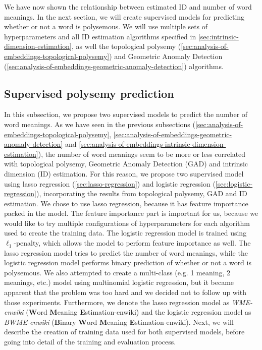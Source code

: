 We have now shown the relationship between estimated ID and number of word meanings. In the next section, we will create supervised models for predicting whether or not a word is polysemous. We will use multiple sets of hyperparameters and all ID estimation algorithms specified in \cref{sec:intrinsic-dimension-estimation}, as well the topological polysemy (\cref{sec:analysis-of-embeddings-topological-polysemy}) and Geometric Anomaly Detection (\cref{sec:analysis-of-embeddings-geometric-anomaly-detection}) algorithms.

\subsection{Supervised polysemy prediction}
\label{sec:analysis-of-embeddings-supervised-polysemy-prediction}
In this subsection, we propose two supervised models to predict the number of word meanings. As we have seen in the previous subsections (\cref{sec:analysis-of-embeddings-topological-polysemy}, \cref{sec:analysis-of-embeddings-geometric-anomaly-detection} and \cref{sec:analysis-of-embeddings-intrinsic-dimension-estimation}), the number of word meanings seem to be more or less correlated with topological polysemy, Geometric Anomaly Detection (GAD) and intrinsic dimension (ID) estimation. For this reason, we propose two supervised model using lasso regression (\cref{sec:lasso-regression}) and logistic regression (\cref{sec:logistic-regression}), incorporating the results from topological polysemy, GAD and ID estimation. We chose to use lasso regression, because it has feature importance packed in the model. The feature importance part is important for us, because we would like to try multiple configurations of hyperparameters for each algorithm used to create the training data. The logistic regression model is trained using $\ell_1$-penalty, which allows the model to perform feature importance as well. The lasso regression model tries to predict the number of word meanings, while the logistic regression model performs binary prediction of whether or not a word is polysemous. We also attempted to create a multi-class (e.g. 1 meaning, 2 meanings, etc.) model using multinomial logistic regression, but it became apparent that the problem was too hard and we decided not to follow up with those experiments. Furthermore, we denote the lasso regression model as \textit{WME-enwiki} (\textbf{W}ord \textbf{M}eaning \textbf{E}stimation-enwiki) and the logistic regression model as \textit{BWME-enwiki} (\textbf{B}inary \textbf{W}ord \textbf{M}eaning \textbf{E}stimation-enwiki). Next, we will describe the creation of training data used for both supervised models, before going into detail of the training and evaluation process.

